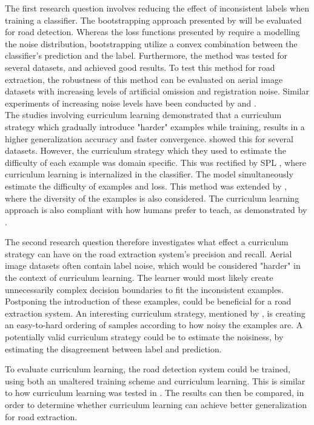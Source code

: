 The first research question involves reducing the effect of inconsistent labels when training a classifier. The bootstrapping approach presented by \cite{Reed_noisy_labels_bootstrapping} will be evaluated for road detection. Whereas the loss functions presented by \citep{Mnih_aerial_images_noisy} require a modelling the noise distribution,  bootstrapping utilize a convex combination between the classifier's prediction and the label. Furthermore, the method was tested for several datasets, and achieved good results. To test this method for road extraction, the robustness of this method can be evaluated on aerial image datasets with increasing levels of artificial omission and registration noise. Similar experiments of increasing noise levels have been conducted by \citep{Sukhbaatar_noisy_network_learning} and \citep{Reed_noisy_labels_bootstrapping}.\\

The studies involving curriculum learning demonstrated that a curriculum strategy which gradually introduce "harder" examples while training, results in a higher generalization accuracy and faster convergence. \citep{Bengio_curriculumlearning} showed this for several datasets. However, the curriculum strategy which they used to estimate the difficulty of each example was domain specific. This was rectified by \ac{SPL} \cite{Kumar_self_paced_learning}, where curriculum learning is internalized in the classifier. The model simultaneously estimate the difficulty of examples and loss. This method was extended by \citep{Lu_self-paced_learning_diversity}, where the diversity of the examples is also considered. The curriculum learning approach is also compliant with how humans prefer to teach, as demonstrated by \cite{Khan_human_teach}.

The second research question therefore investigates what effect a curriculum strategy can have on the road extraction system's precision and recall. Aerial image datasets often contain label noise, which would be considered "harder" in the context of curriculum learning. The learner would most likely create unnecessarily complex decision boundaries to fit the inconsistent examples. Postponing the introduction of these examples, could be beneficial for a road extraction system. An interesting curriculum strategy, mentioned by \cite{Bengio_curriculumlearning}, is creating an easy-to-hard ordering of samples according to how noisy the examples are. A potentially valid curriculum strategy could be to estimate the noisiness, by estimating the disagreement between label and prediction.

To evaluate curriculum learning, the road detection system could be trained, using both an unaltered training scheme and curriculum learning. This is similar to how curriculum learning was tested in \citep{Bengio_curriculumlearning}. The results can then be compared, in order to determine whether curriculum learning can achieve better generalization for road extraction.\\

